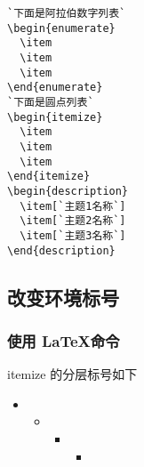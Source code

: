 
\begin{lstlisting}[language={[LATEX]TEX}]
`下面是阿拉伯数字列表`
\begin{enumerate}
  \item 
  \item 
  \item 
\end{enumerate}
`下面是圆点列表`
\begin{itemize}
  \item 
  \item 
  \item 
\end{itemize}
\begin{description}
  \item[`主题1名称`] 
  \item[`主题2名称`] 
  \item[`主题3名称`] 
\end{description}

\end{lstlisting}



\subsection{改变环境标号}





\subsubsection{使用 \LaTeX 命令}

itemize 的分层标号如下

\begin{itemize}
  \item
  \begin{itemize}
           \item
           \begin{itemize}
             \item
             \begin{itemize}
               \item
             \end{itemize}
           \end{itemize}
         \end{itemize}
\end{itemize}

